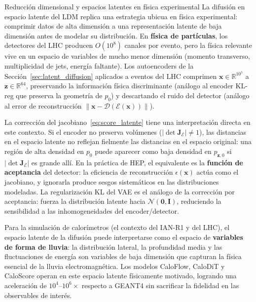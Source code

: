 \begin{fisicaconexion}{Reducción dimensional y espacios latentes en física experimental}
La difusión en espacio latente del LDM replica una estrategia ubicua en física
experimental: comprimir datos de alta dimensión a una representación latente
de baja dimensión antes de modelar su distribución. En \textbf{física de
partículas}, los detectores del LHC producen $O(10^8)$ canales por evento, pero
la física relevante vive en un espacio de variables de mucho menor dimensión
(momento transverso, multiplicidad de jets, energía faltante). Los autoencoders
de la Sección~\ref{sec:latent_diffusion} aplicados a eventos del LHC comprimen
$\bm{x}\in\mathbb{R}^{10^5}$ a $\bm{z}\in\mathbb{R}^{64}$, preservando la
información física discriminante (análogo al encoder KL-reg que preserva la
geometría de $p_0$) y descartando el ruido del detector (análogo al error de
reconstrucción $\|\bm{x}-\mathcal{D}(\mathcal{E}(\bm{x}))\|$).

La corrección del jacobiano~\eqref{eq:score_latente} tiene una interpretación
directa en este contexto. Si el encoder no preserva volúmenes
($|\det\bm{J}_\mathcal{E}| \neq 1$), las distancias en el espacio latente no
reflejan fielmente las distancias en el espacio original: una región de alta
densidad en $p_0$ puede aparecer como baja densidad en $p_{\bm{z},0}$ si
$|\det\bm{J}_\mathcal{E}|$ es grande allí. En la práctica de HEP, el equivalente
es la \textbf{función de aceptancia} del detector: la eficiencia de reconstrucción
$\epsilon(\bm{x})$ actúa como el jacobiano, y ignorarla produce sesgos
sistemáticos en las distribuciones modeladas. La regularización KL del VAE es
el análogo de la corrección por aceptancia: fuerza la distribución latente hacia
$\mathcal{N}(\bm{0},\bm{I})$, reduciendo la sensibilidad a las inhomogeneidades
del encoder/detector.

Para la simulación de calorímetros (el contexto del IAN-R1 y del LHC), el
espacio latente de la difusión puede interpretarse como el espacio de
\textbf{variables de forma de lluvia}: la distribución lateral, la profundidad
media y las fluctuaciones de energía son variables de baja dimensión que
capturan la física esencial de la lluvia electromagnética. Los modelos
CaloFlow, CaloDiT y CaloScore operan en este espacio latente físicamente
motivado, logrando una aceleración de $10^4$--$10^6\times$ respecto a GEANT4
sin sacrificar la fidelidad en las observables de interés.
\end{fisicaconexion}
\label{subsec:latent_score_difusion}


